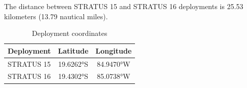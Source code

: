 
The distance between STRATUS 15 and STRATUS 16 deployments is 25.53 kilometers (13.79 nautical miles).

\begin{table}[ht]
\centering
\caption{Deployment coordinates}
\begin{tabular}{lcc}
\hline
\textbf{Deployment} & \textbf{Latitude} & \textbf{Longitude} \\
\hline
STRATUS 15 & 19.6262°S & 84.9470°W \\
STRATUS 16 & 19.4302°S & 85.0738°W \\
\hline
\end{tabular}
\end{table}
